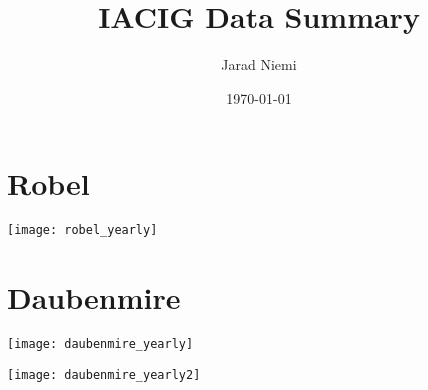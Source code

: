 \documentclass{article}
\title{IACIG Data Summary}
\author{Jarad Niemi}
\date{\today}
\begin{document}
\maketitle

\section{Robel}


\texttt{[image: robel\_yearly]}


\section{Daubenmire}

\texttt{[image: daubenmire\_yearly]}

\texttt{[image: daubenmire\_yearly2]}
\end{document}
